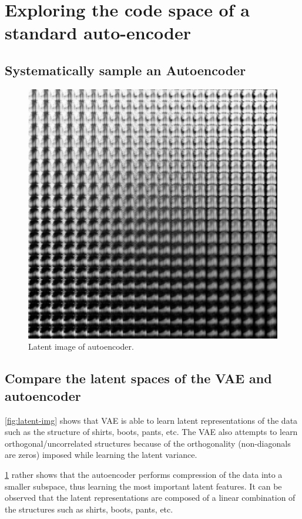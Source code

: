 \documentclass[twocolumn]{article}
\begin{document}
\section{Exploring the code space of a standard auto-encoder}

\subsection{Systematically sample an Autoencoder}

\begin{figure}[H]
    \includegraphics[width=\linewidth]{Figures/latent_img_2.pdf}
    \caption{Latent image of autoencoder.}
    \label{fig:latent-img-2}
\end{figure}

\subsection{Compare the latent spaces of the VAE and autoencoder}

\cref{fig:latent-img} shows that VAE is able to learn latent representations of the data such as the structure of shirts, boots, pants, etc. The VAE also attempts to learn orthogonal/uncorrelated structures because of the orthogonality (non-diagonals are zeros) imposed while learning the latent variance.

\cref{fig:latent-img-2} rather shows that the autoencoder performs compression of the data into a smaller subspace, thus learning the most important latent features. It can be observed that the latent representations are composed of a linear combination of the structures such as shirts, boots, pants, etc.
\end{document}

